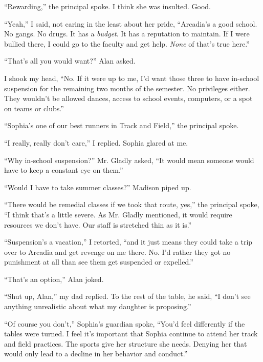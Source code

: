 ``Rewarding,'' the principal spoke.  I think she was insulted.  Good.



``Yeah,'' I said, not caring in the least about her pride, ``Arcadia's a good school.  No gangs.  No drugs.  It has a \emph{budget}.  It has a reputation to maintain.  If I were bullied there, I could go to the faculty and get help.  \emph{None} of that's true here.''



``That's all you would want?'' Alan asked.



I shook my head, ``No.  If it were up to me, I'd want those three to have in-school suspension for the remaining two months of the semester.  No privileges either.  They wouldn't be allowed dances, access to school events, computers, or a spot on teams or clubs.''



``Sophia's one of our best runners in Track and Field,'' the principal spoke.



``I really, really don't care,'' I replied.  Sophia glared at me.



``Why in-school suspension?'' Mr. Gladly asked, ``It would mean someone would have to keep a constant eye on them.''



``Would I have to take summer classes?'' Madison piped up.



``There would be remedial classes if we took that route, yes,'' the principal spoke, ``I think that's a little severe.  As Mr. Gladly mentioned, it would require resources we don't have.  Our staff is stretched thin as it is.''



``Suspension's a vacation,'' I retorted, ``and it just means they could take a trip over to Arcadia and get revenge on me there.  No.  I'd rather they got no punishment at all than see them get suspended or expelled.''



``That's an option,'' Alan joked.



``Shut up, Alan,'' my dad replied.  To the rest of the table, he said, ``I don't see anything unrealistic about what my daughter is proposing.''



``Of course you don't,'' Sophia's guardian spoke, ``You'd feel differently if the tables were turned.  I feel it's important that Sophia continue to attend her track and field practices.  The sports give her structure she needs.  Denying her that would only lead to a decline in her behavior and conduct.''



